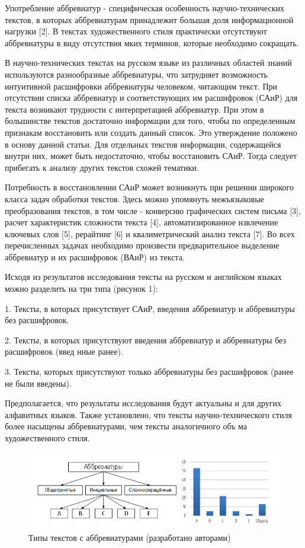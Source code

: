 \documentclass[a4paper]{article}
\begin{document}
Употребление аббревиатур - специфическая особенность научно-технических текстов, в которых аббревиатурам принадлежит большая доля информационной нагрузки [2]. В текстах художественного стиля практически отсутствуют аббревиатуры в виду отсутствия мких терминов, которые необходимо сокращать.

В научно-технических текстах на русском языке из различных областей знаний используются разнообразные аббревиатуры, что затрудняет возможность интуитивной расшифровки аббревиатуры человеком, читающим текст. При отсутствии списка аббревиатур и соответствующих им расшифровок (САиР) для текста возникают трудности с интерпретацией аббревиатур. При этом в большинстве текстов достаточно информации для того, чтобы по определенным признакам восстановить или создать данный список. Это утверждение положено в основу данной статьи. Для отдельных
текстов информации, содержащейся внутри них, может быть недостаточно, чтобы восстановить САиР. Тогда следует прибегать к анализу других текстов схожей тематики.

Потребность в восстановлении САиР может возникнуть при решении широкого класса задач обработки текстов. Здесь можно упомянуть межъязыковые преобразования текстов, в том числе - конверсию графических систем письма [3], расчет характеристик сложности текста [4], автоматизированное извлечение ключевых слов [5], рерайтинг [6] и квалиметрический анализ текста [7]. Во всех перечисленных задачах необходимо произвести предварительное выделение аббревиатур и их расшифровок (ВАиР) из текста.

Исходя из результатов исследования тексты на русском и английском языках можно разделить на три типа (рисунок 1):

1. Тексты, в которых присутствует САиР, введения аббревиатур и аббревиатуры без расшифровок.

2. Тексты, в которых присутствуют введения аббревиатур и аббревиатуры без расшифровок (введ нные ранее).

3. Тексты, которых присутствуют только аббревиатуры без расшифровок (ранее не были введены).

Предполагается, что результаты исследования будут актуальны и для других алфавитных языков. Также установлено, что тексты научно-технического стиля более насыщены аббревиатурами, чем тексты аналогичного объ ма художественного стиля.

\begin{figure}[!h]
\centering
\includegraphics[scale=0.5]{class.png}
\caption{Типы текстов с аббревиатурами (разработано авторами)}
\label{claster_pic1}
\end{figure}
\end{document}
